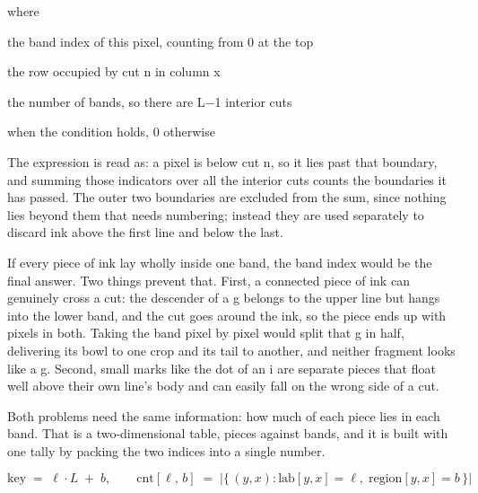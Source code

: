 \noindent where
\begin{description}[leftmargin=2.4em,style=nextline,font=\normalfont\ttfamily]\setlength\itemsep{1pt}
  \item[{$\mathrm{region}[y,x]$}] \normalfont the band index of this pixel, counting from 0 at the top
  \item[{$\mathrm{cuts}_{n}[x]$}] \normalfont the row occupied by cut n in column x
  \item[{$L$}] \normalfont the number of bands, so there are L$-$1 interior cuts
  \item[{$[\;\cdot\;]$}]  when the condition holds, 0 otherwise
\end{description}
The expression is read as: a pixel is below cut n, so it lies past that boundary, and summing those indicators over all the interior cuts counts the boundaries it has passed. The outer two boundaries are excluded from the sum, since nothing lies beyond them that needs numbering; instead they are used separately to discard ink above the first line and below the last.


If every piece of ink lay wholly inside one band, the band index would be the final answer. Two things prevent that. First, a connected piece of ink can genuinely cross a cut: the descender of a g belongs to the upper line but hangs into the lower band, and the cut goes around the ink, so the piece ends up with pixels in both. Taking the band pixel by pixel would split that g in half, delivering its bowl to one crop and its tail to another, and neither fragment looks like a g. Second, small marks like the dot of an i are separate pieces that float well above their own line's body and can easily fall on the wrong side of a cut.


Both problems need the same information: how much of each piece lies in each band. That is a two-dimensional table, pieces against bands, and it is built with one tally by packing the two indices into a single number.


\begin{equation}
\mathrm{key} \;=\; \ell \cdot L \;+\; b, \qquad \mathrm{cnt}[\ell,\,b] \;=\; \big|\{\,(y,x) : \mathrm{lab}[y,x]=\ell,\; \mathrm{region}[y,x]=b \,\}\big|
\end{equation}

